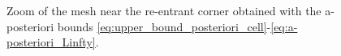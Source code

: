\documentclass[a4paper,11pt]{article}
\begin{document}
{\begin{figure}[ht]
{  }
\caption{Zoom of the mesh near the re-entrant corner obtained with the a-posteriori bounds \eqref{eq:upper_bound_posteriori_cell}-\eqref{eq:a-posteriori_Linfty}.}
\end{figure}

}
\end{document}
